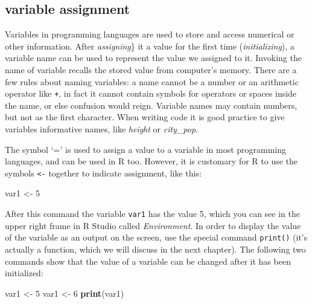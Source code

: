 \documentclass[
]{book}
\newenvironment{Shaded}{\begin{snugshade}}{\end{snugshade}}
\newcommand{\DecValTok}[1]{\textcolor[rgb]{0.00,0.00,0.81}{#1}}
\newcommand{\KeywordTok}[1]{\textcolor[rgb]{0.13,0.29,0.53}{\textbf{#1}}}
\newcommand{\NormalTok}[1]{#1}
\newcommand{\StringTok}[1]{\textcolor[rgb]{0.31,0.60,0.02}{#1}}
\theoremstyle{definition}
\theoremstyle{definition}
\theoremstyle{definition}
\theoremstyle{remark}
\begin{document}
\hypertarget{variable-assignment}{%
\subsection{variable assignment}\label{variable-assignment}}

Variables in programming languages are used to store and access numerical or other information. After \emph{assigning}\} it a value for the first time (\emph{initializing}), a variable name can be used to represent the value we assigned to it. Invoking the name of variable recalls the stored value from computer's memory. There are a few rules about naming variables: a name cannot be a number or an arithmetic operator like \texttt{+}, in fact it cannot contain symbols for operators or spaces inside the name, or else confusion would reign. Variable names may contain numbers, but not as the first character. When writing code it is good practice to give variables informative names, like \emph{height} or \emph{city\_pop}. 

The symbol `=' is used to assign a value to a variable in most programming languages, and can be used in R too. However, it is customary for R to use the symbols \texttt{\textless{}-} together to indicate assignment, like this:

\begin{Shaded}
\begin{Highlighting}[]
\NormalTok{var1 \textless{}{-}}\StringTok{ }\DecValTok{5}
\end{Highlighting}
\end{Shaded}

After this command the variable \texttt{var1} has the value 5, which you can see in the upper right frame in R Studio called \emph{Environment}. In order to display the value of the variable as an output on the screen, use the special command \texttt{print()} (it's actually a function, which we will discuss in the next chapter). The following two commands show that the value of a variable can be changed after it has been initialized:

\begin{Shaded}
\begin{Highlighting}[]
\NormalTok{var1 \textless{}{-}}\StringTok{ }\DecValTok{5}
\NormalTok{var1 \textless{}{-}}\StringTok{ }\DecValTok{6}
\KeywordTok{print}\NormalTok{(var1)}
\end{Highlighting}
\end{Shaded}
\end{document}
